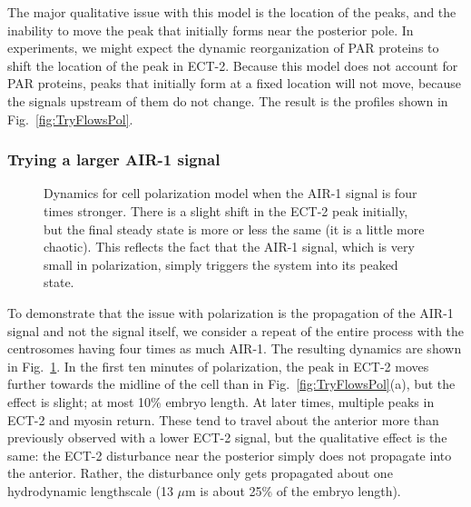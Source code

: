 \documentclass[11pt]{article}
\begin{document}
The major qualitative issue with this model is the location of the peaks, and the inability to move the peak that initially forms near the posterior pole. In experiments, we might expect the dynamic reorganization of PAR proteins to shift the location of the peak in ECT-2. Because this model does not account for PAR proteins, peaks that initially form at a fixed location will not move, because the signals upstream of them do not change. The result is the profiles shown in Fig.\ \ref{fig:TryFlowsPol}. 


\subsubsection{Trying a larger AIR-1 signal}
\begin{figure}
\centering
{}
\caption{\label{fig:TryFlowsPolQ}Dynamics for cell polarization model when the AIR-1 signal is four times stronger. There is a slight shift in the ECT-2 peak initially, but the final steady state is more or less the same (it is a little more chaotic). This reflects the fact that the AIR-1 signal, which is very small in polarization, simply triggers the system into its peaked state.}
\end{figure}

To demonstrate that the issue with polarization is the propagation of the AIR-1 signal and not the signal itself, we consider a repeat of the entire process with the centrosomes having four times as much AIR-1. The resulting dynamics are shown in Fig.\ \ref{fig:TryFlowsPolQ}. In the first ten minutes of polarization, the peak  in ECT-2 moves further towards the midline of the cell than in Fig.\ \ref{fig:TryFlowsPol}(a), but the effect is slight; at most 10\% embryo length. At later times, multiple peaks in ECT-2 and myosin return. These tend to travel about the anterior more than previously observed with a lower ECT-2 signal, but the qualitative effect is the same: the ECT-2 disturbance near the posterior simply does not propagate into the anterior. Rather, the disturbance only gets propagated about one hydrodynamic lengthscale (13 $\mu$m is about 25\% of the embryo length). 




\end{document}

